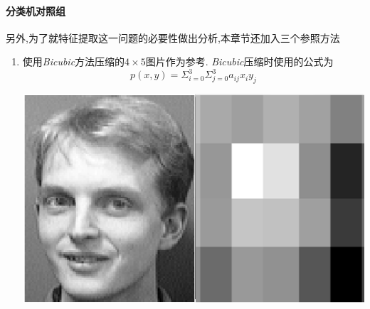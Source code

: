 \paragraph{分类机对照组} 另外,为了就特征提取这一问题的必要性做出分析,本章节还加入三个参照方法\begin{enumerate} 
	\item 使用\textit{Bicubic}方法压缩的$4 \times 5$图片作为参考. \textit{Bicubic}压缩时使用的公式为
$$ p(x,y) = \Sigma_{i=0}^3\Sigma_{j=0}^3 a_{ij} x_i y_j $$

		\begin{center}
	\begin{minipage}[t]{\linewidth}
	\center
	{
	\includegraphics[width=\MyFactor\textwidth]{Img/peo_resize2} 
	}
	\end{minipage}
	\medskip
	\end{center}
	

\end{enumerate}
